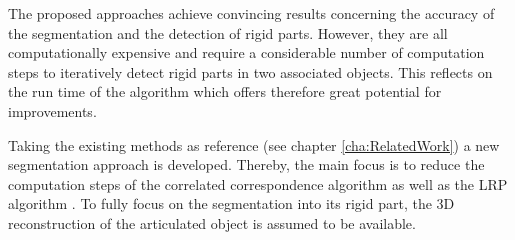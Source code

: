 
The proposed approaches achieve convincing results concerning the accuracy of the segmentation and the detection of rigid parts. However, they are all computationally expensive and require a considerable number of computation steps to iteratively detect rigid parts in two associated objects. This reflects on the run time of the algorithm which offers therefore great potential for improvements.

Taking the existing methods as reference (see chapter \ref{cha:RelatedWork}) a new segmentation approach is developed. Thereby, the main focus is to reduce the computation steps of the correlated correspondence algorithm \cite{CorrelatedCorrespondance} as well as the LRP algorithm \cite {guo2016correspondence}. To fully focus on the segmentation into its rigid part, the 3D reconstruction of the articulated object is assumed to be available.